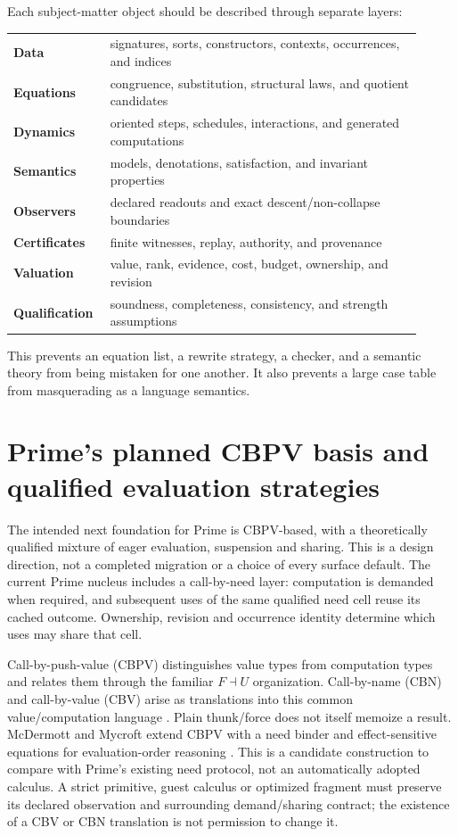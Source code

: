 \documentclass[11pt]{article}
\theoremstyle{definition}
\theoremstyle{remark}
\begin{document}
Each subject-matter object should be described through separate layers:

\begin{center}
\begin{tabular}{>{\bfseries}p{0.19\linewidth}p{0.72\linewidth}}
\toprule
Data & signatures, sorts, constructors, contexts, occurrences, and indices \\
Equations & congruence, substitution, structural laws, and quotient candidates \\
Dynamics & oriented steps, schedules, interactions, and generated computations \\
Semantics & models, denotations, satisfaction, and invariant properties \\
Observers & declared readouts and exact descent/non-collapse boundaries \\
Certificates & finite witnesses, replay, authority, and provenance \\
Valuation & value, rank, evidence, cost, budget, ownership, and revision \\
Qualification & soundness, completeness, consistency, and strength assumptions \\
\bottomrule
\end{tabular}
\end{center}

This prevents an equation list, a rewrite strategy, a checker, and a semantic
theory from being mistaken for one another.  It also prevents a large case table
from masquerading as a language semantics.

\section{Prime's planned CBPV basis and qualified evaluation strategies}

The intended next foundation for Prime is CBPV-based, with a theoretically
qualified mixture of eager evaluation, suspension and sharing. This is a
design direction, not a completed migration or a choice of every surface
default. The current Prime nucleus includes a call-by-need layer: computation
is demanded when required, and subsequent uses of the same qualified need
cell reuse its cached outcome. Ownership, revision and occurrence identity
determine which uses may share that cell.

Call-by-push-value (CBPV) distinguishes value types from computation types and
relates them through the familiar $F\dashv U$ organization. Call-by-name (CBN)
and call-by-value (CBV) arise as translations into this common
value/computation language \cite{LevyCBPV}. Plain thunk/force does not itself
memoize a result. McDermott and Mycroft extend CBPV with a need binder and
effect-sensitive equations for evaluation-order reasoning
\cite{McDermottMycroftExtendedCBPV}. This is a candidate construction to
compare with Prime's existing need protocol, not an automatically adopted
calculus. A strict primitive, guest calculus or optimized fragment must
preserve its declared observation and surrounding demand/sharing contract;
the existence of a CBV or CBN translation is not permission to change it.
\end{document}

